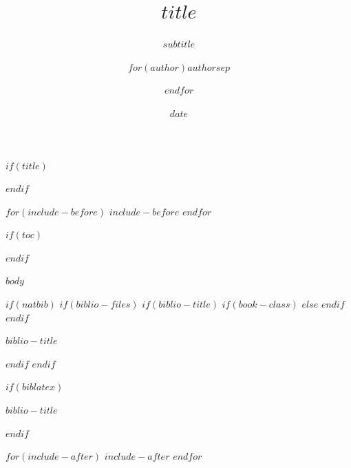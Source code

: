 \documentclass[$if(fontsize)$$fontsize$,$endif$%
							 $if(handout)$handout,$endif$%
							 $if(beamer)$ignorenonframetext,$endif$%
							 $for(classoption)$$classoption$$sep$,$endfor$]{$documentclass$}
\title{$title$}
\subtitle{$subtitle$}
\author{$for(author)$$author$$sep$ \and $endfor$}
\date{$date$}
\begin{document}
$if(title)$
\begin{frame}[plain]
	\titlepage
\end{frame}
$endif$

$for(include-before)$
	$include-before$
$endfor$

$if(toc)$
	\begin{frame}
		\tableofcontents[hideallsubsections]
	\end{frame}
$endif$

$body$

$if(natbib)$
	$if(biblio-files)$
		$if(biblio-title)$
			$if(book-class)$
				\renewcommand\bibname{$biblio-title$}
			$else$
				\renewcommand\refname{$biblio-title$}
			$endif$
		$endif$
			\begin{frame}[allowframebreaks]{$biblio-title$}
				
			\end{frame}
	$endif$
$endif$

$if(biblatex)$
	\begin{frame}[allowframebreaks]{$biblio-title$}
		\printbibliography[heading=none]
	\end{frame}
$endif$

$for(include-after)$
	$include-after$
$endfor$
\end{document}
